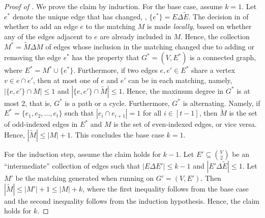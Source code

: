 
\begin{proof}[Proof of ]
	We prove the claim by induction. 
	For the base case, assume $k=1$. Let $e^*$ denote the unique edge that has changed, \ie, $\{e^*\} = E \Delta \widetilde{E}$. 
	The decision in  of whether to add an edge $e$ to the matching $M$ is made \emph{locally}, based on whether any of the edges adjacent to $e$ are already included in $M$. Hence, the collection $M^* = \widetilde{M} \Delta M$ of edges whose inclusion in the matching changed due to adding or removing the edge $e^*$ has the property that $G^* = (V, E^*)$ is a connected graph, where $E^* = M^* \cup \{e^*\}$. Furthermore, if two edges $e,e' \in E^*$ share a vertex $v \in e \cap e'$, then at most one of $e$ and $e'$ can be in each matching, namely, $|\{e,e'\} \cap M| \leq 1$ and $|\{e,e'\} \cap \widetilde{M}| \leq 1$. Hence, the maximum degree in $G^*$ is at most $2$, that is, $G^*$ is a path or a cycle. Furthermore, $G^*$ is alternating. Namely, if $E^* = \{e_1,e_2,...,e_t\}$ such that $|e_i \cap e_{i+1}| = 1$ for all $i \in [t-1]$, then $\widetilde{M}$ is the set of odd-indexed edges in $E^*$ and $M$ is the set of even-indexed edges, or vice versa. Hence, $|\widetilde{M}| \leq |M| + 1$. This concludes the base case $k=1$.

	For the induction step, assume the claim holds for $k-1$. Let $E' \subseteq \binom{V}{2}$ be an ``intermediate'' collection of edges such that $|E \Delta E'| \leq k-1$ and $|E' \Delta \widetilde{E}| \leq 1$. Let $M'$ be the matching generated when running  on $G' = (V,E')$. Then $|\widetilde{M}| \leq |M'| + 1 \leq |M| + k$, where the first inequality follows from the base case and the second inequality follows from the induction hypothesis. Hence, the claim holds for $k$.
\end{proof}


